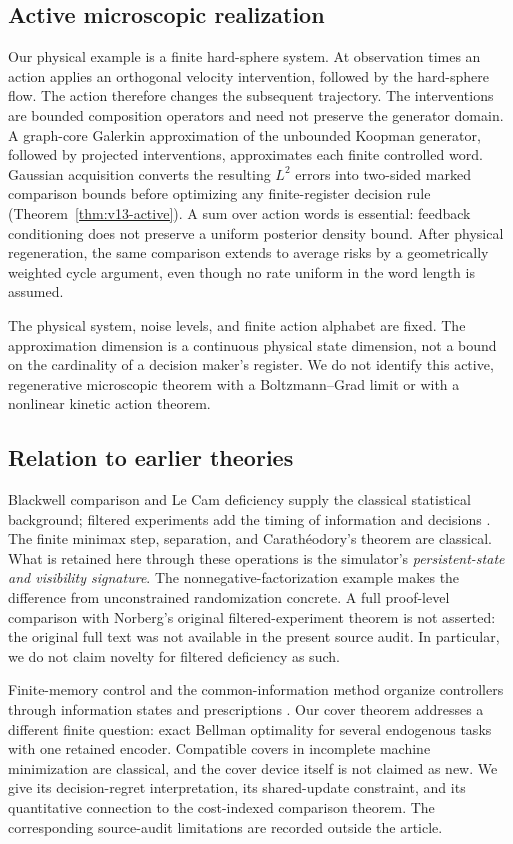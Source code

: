 \subsection{Active microscopic realization}
Our physical example is a finite hard-sphere system. At observation times
an action applies an orthogonal velocity intervention, followed by the
hard-sphere flow. The action therefore changes the subsequent trajectory.
The interventions are bounded composition operators and need not preserve
the generator domain. A graph-core Galerkin approximation of the unbounded
Koopman generator, followed by projected interventions, approximates each
finite controlled word. Gaussian acquisition converts the resulting
$L^2$ errors into two-sided marked comparison bounds before optimizing
any finite-register decision rule
(Theorem~\ref{thm:v13-active}). A sum over action words is essential:
feedback conditioning does not preserve a uniform posterior density
bound. After physical regeneration, the same comparison extends to
average risks by a geometrically weighted cycle argument, even though
no rate uniform in the word length is assumed.

The physical system, noise levels, and finite action alphabet are fixed.
The approximation dimension is a continuous physical state dimension,
not a bound on the cardinality of a decision maker's register. We do not
identify this active, regenerative microscopic theorem with a
Boltzmann--Grad limit or with a nonlinear kinetic action theorem.

\subsection{Relation to earlier theories}
Blackwell comparison and Le Cam deficiency supply the classical
statistical background; filtered experiments add the timing of
information and decisions \cite{Blackwell1953,LeCam1964,Norberg2002}.
The finite minimax step, separation, and Carath\'eodory's theorem are
classical. What is retained here through these operations is the
simulator's \emph{persistent-state and visibility signature}. The
nonnegative-factorization example makes the difference from unconstrained
randomization concrete. A full proof-level comparison with Norberg's
original filtered-experiment theorem is not asserted: the original full
text was not available in the present source audit. In particular, we do
not claim novelty for filtered deficiency as such.

Finite-memory control and the common-information method organize
controllers through information states and prescriptions
\cite{Witsenhausen1979,NayyarMahajanTeneketzis2013}. Our cover theorem
addresses a different finite question: exact Bellman optimality for
several endogenous tasks with one retained encoder. Compatible covers
in incomplete machine minimization are classical, and the cover device
itself is not claimed as new. We give its decision-regret interpretation,
its shared-update constraint, and its quantitative connection to the
cost-indexed comparison theorem. The corresponding source-audit
limitations are recorded outside the article.

